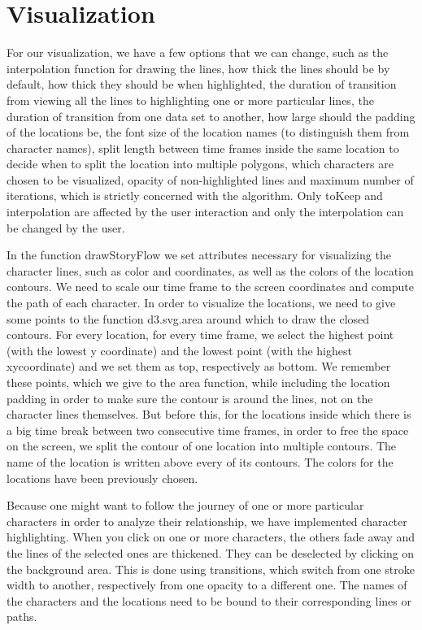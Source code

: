 \documentclass{report}
\begin{document}
\section{Visualization}
\par
For our visualization, we have a few options that we can change, such as the interpolation function for drawing the lines, how thick the lines should be by default, how thick they should be when highlighted, the duration of transition from viewing all the lines to highlighting one or more particular lines, the duration of transition from one data set to another, how large should the padding of the locations be, the font size of the location names (to distinguish them from character names), split length between time frames inside the same location to decide when to split the location into multiple polygons, which characters are chosen to be visualized, opacity of non-highlighted lines and maximum number of iterations, which is strictly concerned with the algorithm. Only toKeep and interpolation are affected by the user interaction and only the interpolation can be changed by the user.
\par
In the function drawStoryFlow we set attributes necessary for visualizing the character lines, such as color and coordinates, as well as the colors of the location contours. We need to scale our time frame to the screen coordinates and compute the path of each character.
In order to visualize the locations, we need to give some points to the function d3.svg.area around which to draw the closed contours. For every location, for every time frame, we select the highest point (with the lowest y coordinate) and the lowest point (with the highest xycoordinate) and we set them as top, respectively as bottom. We remember these points, which we give to the area function, while including the location padding in order to make sure the contour is around the lines, not on the character lines themselves. But before this, for the locations inside which there is a big time break between two consecutive time frames, in order to free the space on the screen, we split the contour of one location into multiple contours. The name of the location is written above every of its contours. The colors for the locations have been previously chosen.
\par
Because one might want to follow the journey of one or more particular characters in order to analyze their relationship, we have implemented character highlighting. When you click on one or more characters, the others fade away and the lines of the selected ones are thickened. They can be deselected by clicking on the background area. This is done using transitions, which switch from one stroke width to another, respectively from one opacity to a different one. The names of the characters and the locations need to be bound to their corresponding lines or paths.
\end{document}
